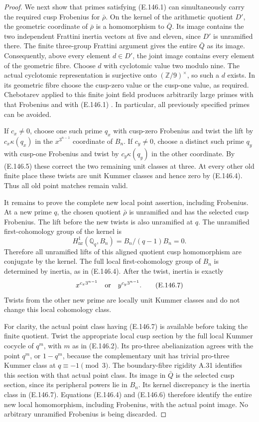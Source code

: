 \begin{proof}
We next show that primes satisfying (E.146.1)
can simultaneously carry the required cusp
Frobenius for \(\bar\rho\).
On the kernel of the arithmetic quotient \(D'\),
the geometric coordinate of \(\bar\rho\) is
a homomorphism to \(\bar Q\).
Its image contains the two independent Frattini
inertia vectors at five and eleven, since
\(D'\) is unramified there.
The finite three-group Frattini argument gives
the entire \(\bar Q\) as its image.
Consequently, above every element \(d\in D'\),
the joint image contains every element of
the geometric fibre.
Choose \(d\) with cyclotomic value two modulo
nine. The actual cyclotomic representation is
surjective onto \((\mathbb Z/9)^\times\), so
such a \(d\) exists.
In its geometric fibre choose the cusp-zero
value or the cusp-one value, as required.
Chebotarev applied to this finite joint field
produces arbitrarily large primes with that
Frobenius and with (E.146.1)
\citep[Theorem 8.31]{CohMilneANT}.
In particular, all previously specified primes
can be avoided.

If \(c_x\ne0\), choose one such prime \(q_x\)
with cusp-zero Frobenius and twist the lift
by \(c_x\kappa(q_x)\) in the
\(x^{3^{n-1}}\) coordinate of \(B_n\).
If \(c_y\ne0\), choose a distinct such prime
\(q_y\) with cusp-one Frobenius and twist
by \(c_y\kappa(q_y)\) in the other coordinate.
By (E.146.5) these correct the two remaining
unit classes at three.
At every other old finite place these twists
are unit Kummer classes and hence zero by
(E.146.4). Thus all old point matches remain
valid.

It remains to prove the complete new local
point assertion, including Frobenius.
At a new prime \(q\), the chosen quotient
\(\bar\rho\) is unramified and has the selected
cusp Frobenius. The lift before the new twists
is also unramified at \(q\).
The unramified first-cohomology group of the
kernel is
\[
 H^1_{\mathrm{nr}}(\mathbb Q_q,B_n)
     = B_n/(q-1)B_n=0.
 \tag{E.146.6}
\]
Therefore all unramified lifts of this aligned
quotient cusp homomorphism are conjugate by
the kernel. The full local first-cohomology
group of \(B_n\) is determined by inertia,
as in (E.146.4).
After the twist, inertia is exactly
\[
 x^{c_x3^{n-1}}\quad\hbox{or}\quad
 y^{c_y3^{n-1}}.
 \tag{E.146.7}
\]
Twists from the other new prime are locally
unit Kummer classes and do not change this
local cohomology class.

For clarity, the actual point class having
(E.146.7) is available before taking the finite
quotient. Twist the appropriate local cusp
section by the full local Kummer cocycle
of \(q^m\), with \(m\) as in (E.146.2).
Its pro-three abelianization agrees with the
point \(q^m\), or \(1-q^m\), because the
complementary unit has trivial pro-three
Kummer class at \(q\equiv-1\pmod3\).
The boundary-fibre rigidity A.31 identifies
this section with that actual point class.
Its image in \(\bar Q\) is the selected cusp
section, since its peripheral powers lie
in \(B_n\).
Its kernel discrepancy is the inertia class
in (E.146.7).
Equations (E.146.4) and (E.146.6) therefore
identify the entire new local homomorphism,
including Frobenius, with the actual point
image. No arbitrary unramified Frobenius
is being discarded.


\end{proof}
